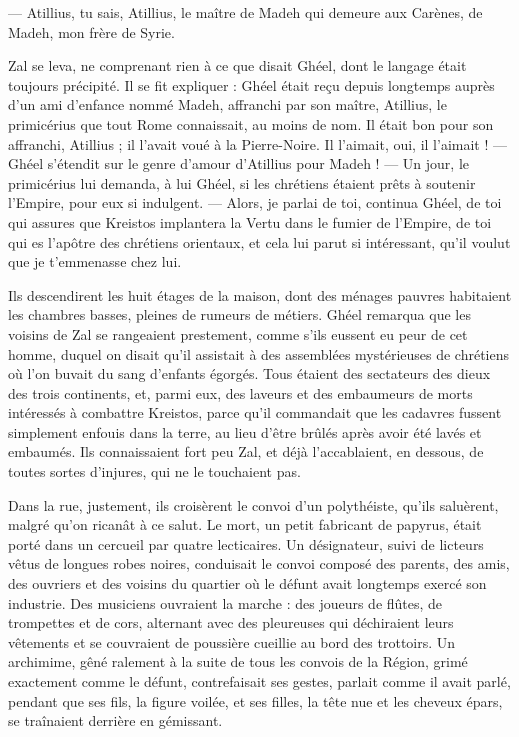 \documentclass[a4paper, 11pt, oneside, polutonikogreek, french]{article}
\begin{document}
--- Atillius, tu sais, Atillius, le maître de Madeh qui demeure aux Carènes, de Madeh, mon frère de Syrie.

Zal se leva, ne comprenant rien à ce que disait Ghéel, dont le langage était toujours précipité. Il se fit expliquer : Ghéel était reçu depuis longtemps auprès d'un ami d'enfance nommé Madeh, affranchi par son maître, Atillius, le primicérius que tout Rome connaissait, au moins de nom. Il était bon pour son affranchi, Atillius ; il l'avait voué à la Pierre-Noire. Il l'aimait, oui, il l’aimait ! --- Ghéel s'étendit sur le genre d'amour d'Atillius pour Madeh ! --- Un jour, le primicérius lui demanda, à lui Ghéel, si les chrétiens étaient prêts à soutenir l'Empire, pour eux si indulgent. --- Alors, je parlai de toi, continua Ghéel, de toi qui assures que Kreistos implantera la Vertu dans le fumier de l'Empire, de toi qui es l'apôtre des chrétiens orientaux, et cela lui parut si intéressant, qu'il voulut que je t'emmenasse chez lui.

Ils descendirent les huit étages de la maison, dont des ménages pauvres habitaient les chambres basses, pleines de rumeurs de métiers. Ghéel remarqua que les voisins de Zal se rangeaient prestement, comme s'ils eussent eu peur de cet homme, duquel on disait qu'il assistait à des assemblées mystérieuses de chrétiens où l'on buvait du sang d'enfants égorgés. Tous étaient des sectateurs des dieux des trois continents, et, parmi eux, des laveurs et des embaumeurs de morts intéressés à combattre Kreistos, parce qu'il commandait que les cadavres fussent simplement enfouis dans la terre, au lieu d'être brûlés après avoir été lavés et embaumés. Ils connaissaient fort peu Zal, et déjà l'accablaient, en dessous, de toutes sortes d'injures, qui ne le touchaient pas.

Dans la rue, justement, ils croisèrent le convoi d'un polythéiste, qu'ils saluèrent, malgré qu'on ricanât à ce salut. Le mort, un petit fabricant de papyrus, était porté dans un cercueil par quatre lecticaires. Un désignateur, suivi de licteurs vêtus de longues robes noires, conduisait le convoi composé des parents, des amis, des ouvriers et des voisins du quartier où le défunt avait longtemps exercé son industrie. Des musiciens ouvraient la marche : des joueurs de flûtes, de trompettes et de cors, alternant avec des pleureuses qui déchiraient leurs vêtements et se couvraient de poussière cueillie au bord des trottoirs. Un archimime, gêné ralement à la suite de tous les convois de la Région, grimé exactement comme le défunt, contrefaisait ses gestes, parlait comme il avait parlé, pendant que ses fils, la figure voilée, et ses filles, la tête nue et les cheveux épars, se traînaient derrière en gémissant.
\end{document}
